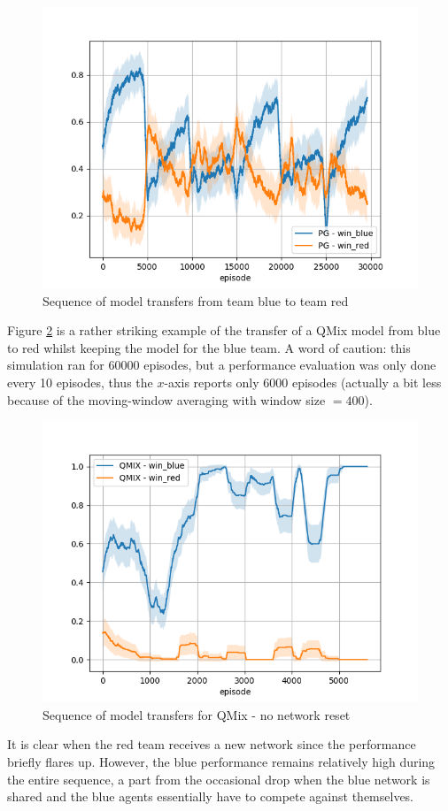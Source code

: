 \begin{figure}[htp]
    \centering
    \includegraphics[width=14cm]{images/iteration/iterative.png}
    \caption{Sequence of model transfers from team blue to team red}
    \label{fig:iteration}
\end{figure}
Figure \ref{fig:iterative_qmix} is a rather striking example of the transfer of a QMix model from blue to red whilst keeping the model for the blue team. A word of caution: this simulation ran for 60000 episodes, but a performance evaluation was only done every 10 episodes, thus the $x$-axis reports only 6000 episodes (actually a bit less because of the moving-window averaging with window size $=400$).
\begin{figure}[htp]
    \centering
    \includegraphics[width=14cm]{images/iteration/iterative_qmix.png}
    \caption{Sequence of model transfers for QMix - no network reset}
    \label{fig:iterative_qmix}
\end{figure}
It is clear when the red team receives a new network since the performance briefly flares up. However, the blue performance remains relatively high during the entire sequence, a part from the occasional drop when the blue network is shared and the blue agents essentially have to compete against themselves.




